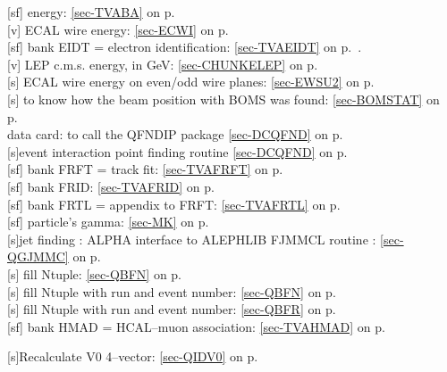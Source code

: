  [sf] energy: \ref{sec-TVABA} on p.~\pageref{sec-TVABA}\\
 [v] ECAL wire energy: \ref{sec-ECWI} on p.~\pageref{sec-ECWI}\\
 [sf] bank EIDT = electron identification:
 \ref{sec-TVAEIDT} on p.~\pageref{sec-TVAEIDT}.\\
 [v] LEP c.m.s. energy, in GeV: \ref{sec-CHUNKELEP} on p.~\pageref{sec-CHUNKELEP}\\
 [s] ECAL wire energy on even/odd wire planes: \ref{sec-EWSU2} on p.~\pageref{sec-EWSU2}\\
 [s] to know how the beam position with BOMS was found:
  \ref{sec-BOMSTAT} on p.~\pageref{sec-BOMSTAT}\\
 data card: to call the QFNDIP package
 \ref{sec-DCQFND} on p.~\pageref{sec-DCQFND}\\
 [s]event interaction point finding routine
 \ref{sec-DCQFND} on p.~\pageref{sec-DCQFND}\\
 [sf] bank FRFT = track fit: \ref{sec-TVAFRFT} on p.~\pageref{sec-TVAFRFT}\\
 [sf] bank FRID: \ref{sec-TVAFRID} on p.~\pageref{sec-TVAFRID}\\
 [sf] bank FRTL = appendix to FRFT:
 \ref{sec-TVAFRTL} on p.~\pageref{sec-TVAFRTL}\\
 [sf] particle's gamma: \ref{sec-MK} on p.~\pageref{sec-MK}\\
 [s]jet finding : ALPHA interface to ALEPHLIB FJMMCL routine :
 \ref{sec-QGJMMC} on p.~\pageref{sec-QGJMMC}\\
 [s] fill Ntuple: \ref{sec-QBFN} on p.~\pageref{sec-QBFN}\\
 [s] fill Ntuple with run and event number:
 \ref{sec-QBFN} on p.~\pageref{sec-QBFN}\\
 [s] fill Ntuple with run and event number:
 \ref{sec-QBFR} on p.~\pageref{sec-QBFR}\\
 [sf] bank HMAD = HCAL--muon association:
 \ref{sec-TVAHMAD} on p.~\pageref{sec-TVAHMAD}
 
 [s]Recalculate V0 4--vector: \ref{sec-QIDV0} on p.~\pageref{sec-QIDV0}
 
